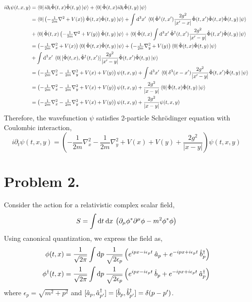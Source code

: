 \documentclass[12pt]{extarticle}
\newcommand{\field}{\hat{\Phi}}
\newcommand{\dfield}{\hat{\Phi}^\dagger}
\begin{document}
\begin{align*}
i \partial_t \psi(t, x, y) & = \bra{0} i \partial_t \field(t, x) \field(t, y) \ket{\psi} + \bra{0} \field(t, x)  i \partial_t \field(t, y) \ket{\psi}
\\
& = \bra{0} \left( -\tfrac{1}{2m} \nabla^2 + V(x)\right) \field(t, x) \field(t, y) \ket{\psi} + \int \d{^3x'}  \bra{0} \dfield(t, x') \frac{2 g^2}{|x' - x|} \field(t, x') \field(t, x) \field(t, y) \ket{\psi}
\\
& + \bra{0} \field(t, x) \left( -\tfrac{1}{2m} \nabla^2 + V(y)\right) \field(t, y) \ket{\psi} + \bra{0} \field(t, x)  \int \d{^3x'}  \dfield(t, x') \frac{2 g^2}{|x' - y|} \field(t, x') \field(t, y) \ket{\psi} 
\\
& = \left( -\tfrac{1}{2m} \nabla_x^2 + V(x)\right) \bra{0} \field(t, x) \field(t, y) \ket{\psi} + \left( -\tfrac{1}{2m} \nabla_y^2 + V(y)\right) \bra{0} \field(t, x) \field(t, y) \ket{\psi}
\\
& + \int \d{^3x'}  \bra{0} [\field(t, x), \dfield(t, x')] \frac{2 g^2}{|x' - y|} \field(t, x') \field(t, y) \ket{\psi}
\\
& = \left( -\tfrac{1}{2m} \nabla_x^2 -\tfrac{1}{2m} \nabla_y^2 + V(x) + V(y)\right) \psi(t, x, y) + \int \d{^3x'}  \bra{0} \delta^3(x - x') \frac{2 g^2}{|x' - y|} \field(t, x') \field(t, y) \ket{\psi}
\\
& = \left( -\tfrac{1}{2m} \nabla_x^2 -\tfrac{1}{2m} \nabla_y^2 + V(x) + V(y)\right) \psi(t, x, y) + \frac{2 g^2}{|x - y|}  \bra{0} \field(t, x) \field(t, y) \ket{\psi}
\\
& = \left( -\tfrac{1}{2m} \nabla_x^2 -\tfrac{1}{2m} \nabla_y^2 + V(x) + V(y)\right) \psi(t, x, y) + \frac{2 g^2}{|x - y|}  \psi(t, x, y)
\end{align*}
Therefore, the wavefunction $\psi$ satisfies 2-particle Schrödinger equation with Coulombic interaction,
\[ i \partial_t \psi(t, x, y) = \left( -\frac{1}{2m} \nabla_x^2 -\frac{1}{2m} \nabla_y^2 + V(x) + V(y) + \frac{2 g^2}{|x - y|} \right) \psi(t, x, y) \]
\section*{Problem 2.}
Consider the action for a relativistic complex scalar field,
\[ S = \int \mathrm{d}t \: \mathrm{d}x \: \left( \partial_\mu \phi^* \partial^\mu \phi - m^2 \phi^* \phi \right) \]
Using canonical quantization, we express the field as,
\begin{align*}
\phi(t, x) & = \frac{1}{\sqrt{2 \pi}} \int \mathrm{d}p \: \frac{1}{\sqrt{2 \epsilon_p}} \left( e^{i p x - i \epsilon_p t} \: \hat{a}_p + e^{- i p x + i \epsilon_p t} \: \hat{b}^\dagger_p \right) 
\\
\phi^\dagger(t, x) & = \frac{1}{\sqrt{2 \pi}} \int \mathrm{d}p \: \frac{1}{\sqrt{2 \epsilon_p}} \left( e^{i p x - i \epsilon_p t} \: \hat{b}_p + e^{- i p x + i \epsilon_p t} \: \hat{a}^\dagger_p \right) 
\end{align*}
where $\epsilon_p = \sqrt{m^2 + p^2}$ and $[\hat{a}_p, \hat{a}^\dagger_{p'}] = [\hat{b}_p, \hat{b}^\dagger_{p'}] = \delta(p - p')$. 
\end{document}
